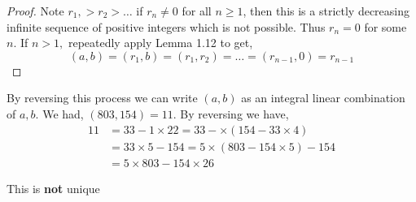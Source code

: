 \begin{proof} 
    Note $r_1, > r_2 > \dots$ if $r_n \ne 0$ for all  $n \ge 1$, then this is a strictly decreasing infinite sequence of positive integers which is not possible. Thus  $r_n  = 0$ for some $n$. If $n > 1, $ repeatedly apply Lemma 1.12 to get, 
    $$ (a, b) = (r_1, b) = (r_1, r_2) = \dots = (r_{n - 1}, 0)  = r_{n - 1}$$ 
\end{proof}

\begin{eg}
    By reversing this process we can write $(a, b)$ as an integral linear combination of  $a, b$. We had, $(803, 154) = 11$. By reversing we have, 
    \begin{align*}
        11 &= 33 - 1 \times  22 = 33 - \times (154 - 33 \times 4)\\
           &= 33 \times  5 - 154 = 5 \times  (803 - 154 \times  5) - 154\\
           &= 5 \times  803 - 154 \times  26
    \end{align*}
\end{eg}
\begin{note}
    This is \textbf{not} unique
\end{note}




